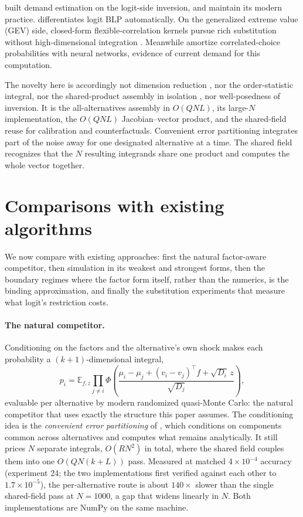 \documentclass[12pt]{article}
\theoremstyle{remark}
\newcommand{\E}{\mathbb{E}}
\begin{document}
 \citet{berry1995} built demand
estimation on the logit-side inversion, and \citet{conlon2020}
maintain its modern practice. \citet{chia2021}
differentiates logit BLP automatically. On the generalized extreme value (GEV) side, closed-form
flexible-correlation kernels pursue rich substitution without
high-dimensional integration \citep{tinessa2020,tinessa2021}.
Meanwhile \citet{huch2026}
amortize correlated-choice probabilities with neural networks, evidence of
current demand for this computation.

The novelty here is accordingly not dimension reduction
\citep{curnow1962}, nor the order-statistic integral, nor the
shared-product assembly in isolation \citep{mahani2019,cotton2021}, nor
well-posedness of inversion. It is the
all-alternatives assembly in $O(QNL)$, its large-$N$ implementation, the
$O(QNL)$ Jacobian--vector product, and the shared-field reuse for
calibration and counterfactuals. Convenient error partitioning
\citep{train1995} integrates part of the noise away for one designated
alternative at a time. The shared field recognizes that the $N$
resulting integrands share one product and computes the whole vector
together.

\section{Comparisons with existing algorithms}\label{sec:comparisons}
\label{sec:boundary}

We now compare with existing approaches: first the natural
factor-aware competitor, then simulation in its weakest and strongest
forms, then the boundary regimes where the factor form itself, rather
than the numerics, is the binding approximation, and finally the
substitution experiments that measure what logit's restriction costs.

\paragraph{The natural competitor.} Conditioning on the factors and the alternative's own shock makes each
probability a $(k{+}1)$-dimensional integral,
\[
p_i = \E_{f,z} \prod_{j \ne i}
\Phi\!\left(\frac{\mu_i - \mu_j + (v_i - v_j)^\top f +
\sqrt{D_i}\,z}{\sqrt{D_j}}\right),
\]
evaluable per alternative by modern randomized quasi-Monte Carlo: the
natural competitor that uses exactly the structure this paper assumes.
The conditioning idea is the \emph{convenient error partitioning} of \citet{train1995}, which conditions on components common across
alternatives and computes what remains analytically. It
still prices $N$ separate integrals, $O(RN^2)$ in total, where the shared
field couples them into one $O(QN(k+L))$ pass. Measured at matched
$4\times10^{-4}$ accuracy (experiment 24; the two implementations first
verified against each other to $1.7\times10^{-5}$), the per-alternative
route is about $140\times$ slower than the single shared-field pass at
$N = 1000$, a gap that widens linearly in $N$.
Both implementations are NumPy on the same machine.
\end{document}
